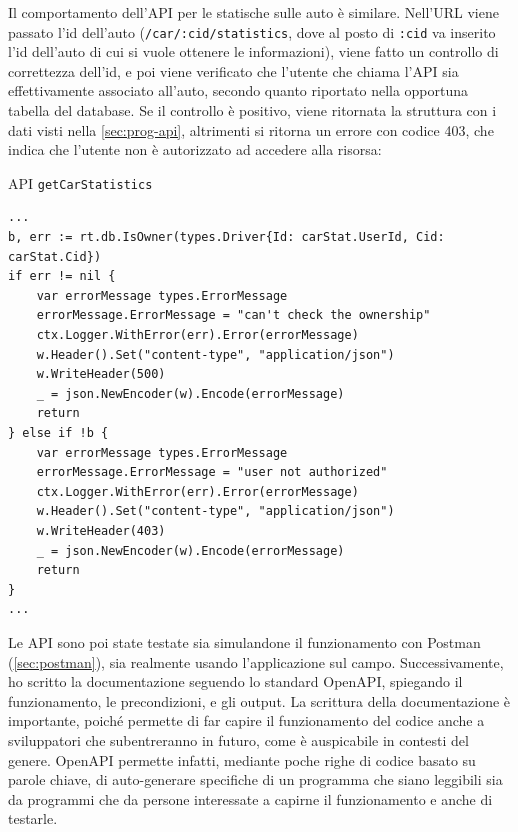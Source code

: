 \documentclass[italian, Lau, oneside, nodefaultfont, noexaminfo]{sapthesis}
\begin{document}
Il comportamento dell'API per le statische sulle auto è similare. Nell'URL viene passato l'id dell'auto (\texttt{/car/:cid/statistics}, dove al posto di \texttt{:cid} va inserito l'id dell'auto di cui si vuole ottenere le informazioni), viene fatto un controllo di correttezza dell'id, e poi viene verificato  che l'utente che chiama l'API sia effettivamente associato all'auto, secondo quanto riportato nella opportuna  tabella del database. Se il controllo è positivo, viene ritornata la struttura con i dati visti nella \autoref{sec:prog-api}, altrimenti si ritorna un errore con codice 403, che indica che l'utente non è autorizzato ad accedere alla risorsa:

\begin{listing}[H]
\caption{API \texttt{getCarStatistics}}
\begin{verbatim}
...
b, err := rt.db.IsOwner(types.Driver{Id: carStat.UserId, Cid: carStat.Cid})
if err != nil {
    var errorMessage types.ErrorMessage
    errorMessage.ErrorMessage = "can't check the ownership"
    ctx.Logger.WithError(err).Error(errorMessage)
    w.Header().Set("content-type", "application/json")
    w.WriteHeader(500)
    _ = json.NewEncoder(w).Encode(errorMessage)
    return
} else if !b {
    var errorMessage types.ErrorMessage
    errorMessage.ErrorMessage = "user not authorized"
    ctx.Logger.WithError(err).Error(errorMessage)
    w.Header().Set("content-type", "application/json")
    w.WriteHeader(403)
    _ = json.NewEncoder(w).Encode(errorMessage)
    return
}
...
\end{verbatim}
\end{listing}
	
Le API sono poi state testate sia simulandone il funzionamento con Postman (\autoref{sec:postman}), sia realmente usando l'applicazione sul campo. 
Successivamente, ho  scritto la documentazione seguendo lo standard OpenAPI, spiegando il funzionamento, le precondizioni,  e gli output.
La scrittura della documentazione è importante, poiché permette di far capire il funzionamento del codice anche a sviluppatori che subentreranno in futuro, come è auspicabile in contesti del genere. OpenAPI permette infatti, mediante poche righe di codice basato su parole chiave, di auto-generare specifiche di un programma che siano leggibili sia da programmi che da persone interessate a capirne il funzionamento e anche di testarle.
\end{document}
